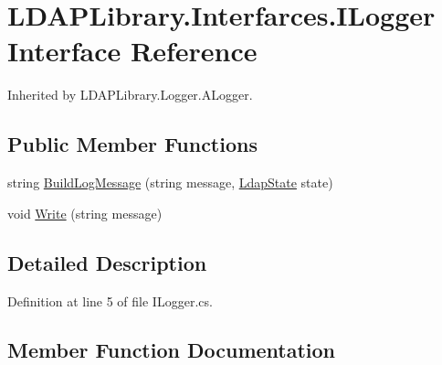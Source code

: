 \hypertarget{interface_l_d_a_p_library_1_1_interfarces_1_1_i_logger}{}\section{L\+D\+A\+P\+Library.\+Interfarces.\+I\+Logger Interface Reference}
\label{interface_l_d_a_p_library_1_1_interfarces_1_1_i_logger}


Inherited by L\+D\+A\+P\+Library.\+Logger.\+A\+Logger.

\subsection*{Public Member Functions}
\begin{DoxyCompactItemize}
\item 
string \hyperlink{interface_l_d_a_p_library_1_1_interfarces_1_1_i_logger_a001b3ba4b246d7d5e70af6f46c8857b7}{Build\+Log\+Message} (string message, \hyperlink{namespace_l_d_a_p_library_1_1_enums_a052eaa58cba3f62d4c008a3b1b347e03}{Ldap\+State} state)
\item 
void \hyperlink{interface_l_d_a_p_library_1_1_interfarces_1_1_i_logger_abf72ea72df3151360eec7f70e170d286}{Write} (string message)
\end{DoxyCompactItemize}


\subsection{Detailed Description}


Definition at line 5 of file I\+Logger.\+cs.



\subsection{Member Function Documentation}
\hypertarget{interface_l_d_a_p_library_1_1_interfarces_1_1_i_logger_a001b3ba4b246d7d5e70af6f46c8857b7}{}
